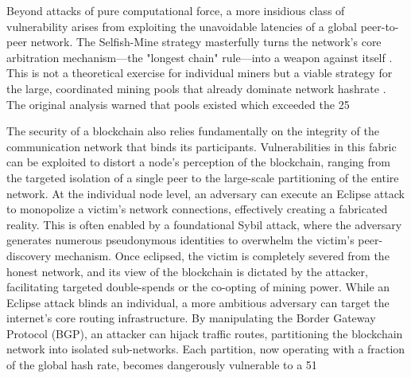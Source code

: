 Beyond attacks of pure computational force, a more insidious class of vulnerability arises from exploiting the unavoidable latencies of a global peer-to-peer network. The Selfish-Mine strategy masterfully turns the network's core arbitration mechanism—the "longest chain" rule—into a weapon against itself \cite{Wang2019, Eyal2014}. This is not a theoretical exercise for individual miners but a viable strategy for the large, coordinated mining pools that already dominate network hashrate \cite{Wang2019}. The original analysis warned that pools existed which exceeded the 25%

The security of a blockchain also relies fundamentally on the integrity of the communication network that binds its participants. Vulnerabilities in this fabric can be exploited to distort a node's perception of the blockchain, ranging from the targeted isolation of a single peer to the large-scale partitioning of the entire network. At the individual node level, an adversary can execute an Eclipse attack to monopolize a victim's network connections, effectively creating a fabricated reality. This is often enabled by a foundational Sybil attack, where the adversary generates numerous pseudonymous identities to overwhelm the victim's peer-discovery mechanism. Once eclipsed, the victim is completely severed from the honest network, and its view of the blockchain is dictated by the attacker, facilitating targeted double-spends or the co-opting of mining power. While an Eclipse attack blinds an individual, a more ambitious adversary can target the internet's core routing infrastructure. By manipulating the Border Gateway Protocol (BGP), an attacker can hijack traffic routes, partitioning the blockchain network into isolated sub-networks. Each partition, now operating with a fraction of the global hash rate, becomes dangerously vulnerable to a 51%


